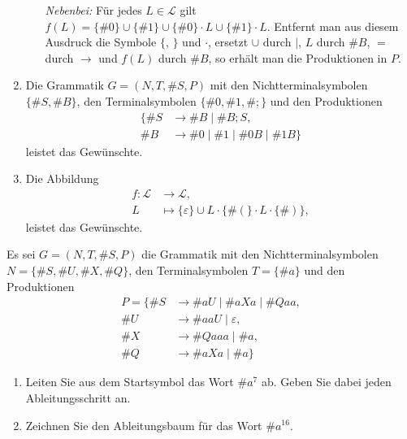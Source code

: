 \documentclass[12pt]{article}
\begin{document}
\begin{loesung}
\begin{enumerate}
\begin{enumerate}
                  \emph{Nebenbei:} Für jedes $L \in \mathcal{L}$ gilt $f(L) = \{\#0\} \cup \{\#1\} \cup \{\#0\} \cdot L \cup \{\#1\} \cdot L$. Entfernt man aus diesem Ausdruck die Symbole $\{$, $\}$ und $\cdot$, ersetzt $\cup$ durch $\mid$, $L$ durch $\#B$, ${=}$ durch $\rightarrow$ und $f(L)$ durch $\#B$, so erhält man die Produktionen in $P$.
          \end{enumerate}
    \item Die Grammatik $G = (N, T, \#S, P)$ mit den Nichtterminalsymbolen $\{ \#S, \#B \}$, den Terminalsymbolen $\{ \#0, \#1, \#; \}$ und den Produktionen
          \begin{align*}
            \{
              \#S &\rightarrow \#B \mid \#{B;S},\\
              \#B &\rightarrow \#0 \mid \#1 \mid \#{0B} \mid \#{1B}
            \}
          \end{align*}
          leistet das Gewünschte.
    \item Die Abbildung
          \begin{align*}
            f \colon \mathcal{L} &\to     \mathcal{L},\\
                               L &\mapsto \{\varepsilon\} \cup L \cdot \{\#(\} \cdot L \cdot \{\#)\},
          \end{align*}
          leistet das Gewünschte.
  \end{enumerate}
\end{loesung}


\newpage
\begin{aufgabe}[2 + 4 = 6]
  Es sei $G = (N, T, \#S, P)$ die Grammatik mit den Nichtterminalsymbolen $N = \{ \#S, \#U, \#X, \#Q \}$, den Terminalsymbolen $T = \{ \#a \}$ und den Produktionen
  \begin{align*}
    P = \{
          \#S &\rightarrow \#{aU} \mid \#{aXa} \mid \#{Qaa},\\
          \#U &\rightarrow \#{aaU} \mid \varepsilon,\\
          \#X &\rightarrow \#{Qaaa} \mid \#a,\\
          \#Q &\rightarrow \#{aXa} \mid \#a
        \}
  \end{align*}
  \begin{enumerate}
    \item Leiten Sie aus dem Startsymbol das Wort $\#{a}^7$ ab. Geben Sie dabei jeden Ableitungsschritt an.
    \item Zeichnen Sie den Ableitungsbaum für das Wort $\#{a}^{16}$. %
  \end{enumerate}
\end{aufgabe}
\end{document}
